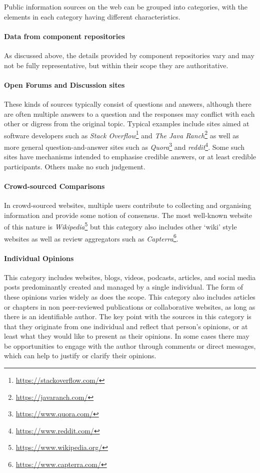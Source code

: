 Public information sources on the web can be grouped into categories, with the elements in each category having different characteristics.

\paragraph{Data from component repositories} As discussed above, the details provided by component repositories vary and may not be fully representative, but within their scope they are authoritative.
    
\paragraph{Open Forums and Discussion sites} These kinds of sources typically consist of questions and answers, although there are often multiple answers to a question and the responses may conflict with each other or digress from the original topic. Typical examples include sites aimed at software developers such as \emph{Stack Overflow}\footnote{\url{https://stackoverflow.com/}} and \emph{The Java Ranch}\footnote{\url{https://javaranch.com/}} as well as more general question-and-answer sites such as \emph{Quora}\footnote{\url{https://www.quora.com/}} and \emph{reddit}\footnote{\url{https://www.reddit.com/}}. Some such sites have mechanisms intended to emphasise credible answers, or at least credible participants. Others make no such judgement.
    
\paragraph{Crowd-sourced Comparisons} In crowd-sourced websites, multiple users contribute to collecting and organising information and provide some notion of consensus. The most well-known website of this nature is \emph{Wikipedia}\footnote{\url{https://www.wikipedia.org/}} but this category also includes other `wiki' style websites as well as review aggregators such as \emph{Capterra}\footnote{\url{https://www.capterra.com/}}.
    
\paragraph{Individual Opinions} This category includes websites, blogs, videos, podcasts, articles, and social media posts predominantly created and managed by a single individual. The form of these opinions varies widely as does the scope. This category also includes articles or chapters in non peer-reviewed publications or collaborative websites, as long as there is an identifiable author. The key point with the sources in this category is that they originate from one individual and reflect that person's opinions, or at least what they would like to present as their opinions. In some cases there may be opportunities to engage with the author through comments or direct messages, which can help to justify or clarify their opinions.
    
